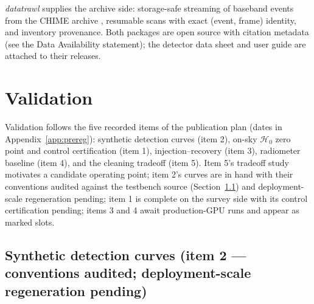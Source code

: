 \textit{datatrawl} supplies the archive side: storage-safe streaming of
baseband events from the CHIME archive \citep[captured by the system
described in][]{michilli2021baseband}, resumable scans with exact
(event, frame) identity, and inventory provenance. Both packages are open
source with citation metadata (see the Data Availability statement); the
detector data sheet and user guide are attached to their releases.

\section{Validation}
\label{sec:validation}

Validation follows the five recorded items of the publication plan
(dates in Appendix~\ref{app:prereg}):
synthetic detection curves (item 2), on-sky $\mathcal{H}_0$ zero point and
control
certification (item 1), injection--recovery (item 3), radiometer baseline
(item 4), and the cleaning tradeoff (item 5). Item 5's tradeoff study
motivates a candidate operating point; item
2's curves are in hand with their conventions audited against the
testbench source (Section~\ref{sec:synthetic}) and deployment-scale
regeneration pending; item 1 is complete on the survey side with its
control certification pending; items 3 and 4 await production-GPU runs
and appear as marked slots.

\subsection{Synthetic detection curves (item 2 --- conventions audited; deployment-scale regeneration pending)}
\label{sec:synthetic}

